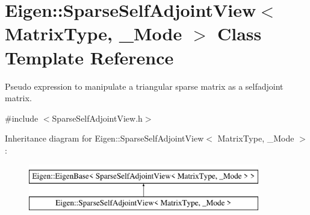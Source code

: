 \hypertarget{class_eigen_1_1_sparse_self_adjoint_view}{}\section{Eigen\+::Sparse\+Self\+Adjoint\+View$<$ Matrix\+Type, \+\_\+\+Mode $>$ Class Template Reference}
\label{class_eigen_1_1_sparse_self_adjoint_view}


Pseudo expression to manipulate a triangular sparse matrix as a selfadjoint matrix.  




{\ttfamily \#include $<$Sparse\+Self\+Adjoint\+View.\+h$>$}

Inheritance diagram for Eigen\+::Sparse\+Self\+Adjoint\+View$<$ Matrix\+Type, \+\_\+\+Mode $>$\+:\begin{figure}[H]
\begin{center}
\leavevmode
\includegraphics[height=2.000000cm]{class_eigen_1_1_sparse_self_adjoint_view}
\end{center}
\end{figure}

